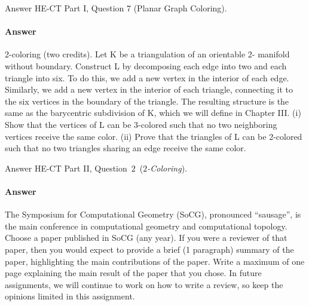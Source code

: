 \documentclass{article}
\begin{document}
Answer HE-CT Part I, Question 7 (Planar Graph Coloring).

\paragraph{Answer}


2-coloring (two credits). Let K be a triangulation of an orientable 2-
manifold without boundary. Construct L by decomposing each edge into
two and each triangle into six. To do this, we add a new vertex in the
interior of each edge. Similarly, we add a new vertex in the interior of each
triangle, connecting it to the six vertices in the boundary of the triangle.
The resulting structure is the same as the barycentric subdivision of K,
which we will define in Chapter III.
(i) Show that the vertices of L can be 3-colored such that no two neighboring
vertices receive the same color.
(ii) Prove that the triangles of L can be 2-colored such that no two triangles
sharing an edge receive the same color.

Answer HE-CT Part II, Question~$2$~(\emph{$2$-Coloring}).

\paragraph{Answer}


The Symposium for Computational Geometry (SoCG), pronounced ``sausage'', is the
main conference in computational geometry and computational topology.
Choose a paper published in SoCG (any year).  If
you were a reviewer of that paper, then you would expect to provide a brief (1
paragraph) summary of the paper, highlighting the main contributions of the
paper.  Write a maximum of one page explaining the main result of the paper that
you chose.  In future assignments, we will continue to work on how to write a
review, so keep the opinions limited in this assignment.
\end{document}
